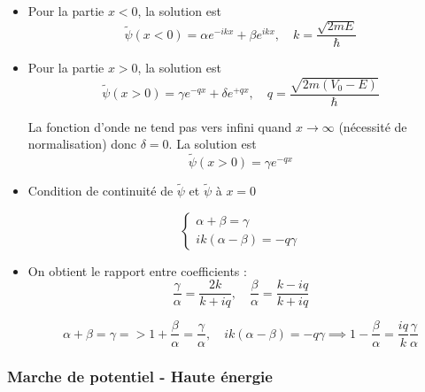 \begin{itemize}

    \item Pour la partie $x< 0$, la solution est 
\begin{equation}
  \widetilde \psi (x < 0 ) =  \alpha e ^{-ikx} + \beta e ^{ikx} ,\quad k = \frac{\sqrt{2mE}}{\hbar} 
\end{equation}

\item Pour la partie $x > 0$, la solution est 
\begin{equation}
  \widetilde \psi (x >0) = \gamma e ^{-qx} + \delta e ^{+qx}, \quad q = \frac{\sqrt{2m (V_0 - E)}}{\hbar} 
\end{equation}

La fonction d'onde ne tend pas vers infini quand $x \to \infty$ (nécessité de normalisation) donc $\delta = 0$. La solution est 
\begin{equation}
  \widetilde \psi (x > 0) = \gamma e ^{-qx}
\end{equation}

\item Condition de continuité de $\widetilde\psi$ et $\widetilde \psi$ à $x = 0$ 

  \begin{equation}
    \begin{cases}
        \alpha + \beta = \gamma \\ 
        ik (\alpha - \beta) = -q \gamma
    \end{cases}
  \end{equation}

\item On obtient le rapport entre coefficients : 
  \begin{equation}
    \frac{\gamma}{\alpha}  = \frac{2k}{k+iq} , \quad \frac{\beta}{\alpha}  = \frac{k - iq}{k + iq} 
  \end{equation}

  \begin{myproof}{}{}
    \begin{equation}
    \alpha + \beta = \gamma => 1  + \frac{\beta}{\alpha}  = \frac{\gamma}{\alpha} , \quad ik(\alpha - \beta) = -q \gamma \implies 1- \frac{\beta}{\alpha}  = \frac{iq}{k}  \frac{\gamma}{\alpha} 
    \end{equation}
  \end{myproof}
\end{itemize}


\subsubsection{Marche de potentiel - Haute énergie} %

